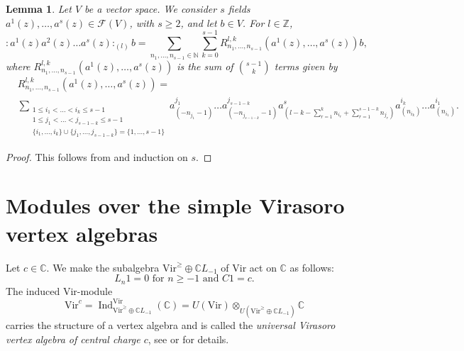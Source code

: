 \documentclass[a4paper, 12pt, reqno]{amsart}
\newtheorem{lemma}[theorem]{Lemma}
\theoremstyle{remark}
\DeclareMathOperator{\Ind}{Ind}
\newcommand{\Vir}{{\mathrm{Vir}}}
\begin{document}
\begin{lemma}
  \label{lmm:2}
  Let $V$ be a vector space.
  We consider $s$ fields $a^1(z), \dots, a^s(z) \in \mathcal{F}(V)$, with $s \ge 2$, and let $b \in V$.
  For $l \in \mathbb{Z}$,
  \begin{equation*}
    :a^1(z)a^2(z)\dots a^s(z):_{(l)}b = \sum_{n_1, \dots, n_{s - 1} \in \mathbb{N}}\sum_{k = 0}^{s - 1}R^{l, k}_{n_1, \dots, n_{s - 1}}(a^1(z), \dots, a^s(z))b,
  \end{equation*}
  where $R^{l, k}_{n_1, \dots, n_{s - 1}}(a^1(z), \dots, a^s(z))$ is the sum of $\binom{s - 1}{k}$ terms given by
  \begin{align*}
    &R^{l, k}_{n_1, \dots, n_{s - 1}}(a^1(z), \dots, a^s(z)) = \\
    &\sum_{\substack{1 \le i_1 < \dots < i_k \le s - 1 \\ 1 \le j_1 < \dots < j_{s - 1 - k} \le s - 1 \\ \{i_1, \dots, i_k\} \cup \{j_1, \dots, j_{s - 1 - k}\} = \{1, \dots, s - 1\}}}a^{j_1}_{(-n_{j_1} - 1)}\dots a^{j_{s - 1 - k}}_{(-n_{j_{s - 1 - k}} - 1)}a^s_{(l - k - \sum_{r = 1}^kn_{i_r} + \sum_{r = 1}^{s - 1 - k}n_{j_r})}a^{i_k}_{(n_{i_k})}\dots a^{i_1}_{(n_{i_1})}.
  \end{align*}
\end{lemma}

\begin{proof}
  This follows from  and induction on $s$.
\end{proof}

\section{Modules over the simple Virasoro vertex algebras}
\label{sec:modules-over-simple}

Let $c \in \mathbb{C}$.
We make the subalgebra $\Vir^\ge \oplus \mathbb{C}L_{-1}$ of $\Vir$ act on $\mathbb{C}$ as follows:
\begin{equation*}
  \text{$L_n1 = 0$ for $n \ge -1$ and $C1 = c$}.
\end{equation*}
The induced $\Vir$-module
\begin{equation*}
  \Vir^c = \Ind^\Vir_{\Vir^\ge \oplus \mathbb{C}L_{-1}}(\mathbb{C}) = U(\Vir) \otimes_{U(\Vir^\ge \oplus \mathbb{C}L_{-1})} \mathbb{C}
\end{equation*}
carries the structure of a vertex algebra and is called the \emph{universal Virasoro vertex algebra of central charge $c$}, see \cite[\S2]{frenkel_vertex_2001} or \cite[\S2]{callegaro_introduction_2017-1} for details.
\end{document}
